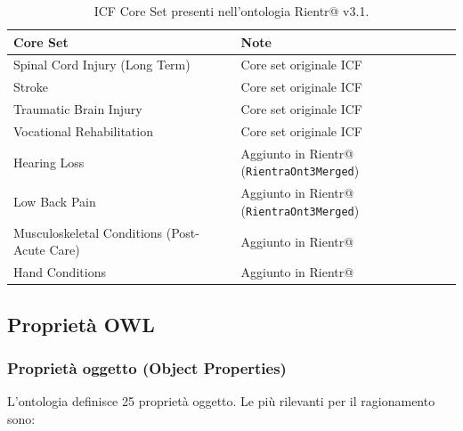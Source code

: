 \documentclass[a4paper,12pt]{article}
\begin{document}
\begin{table}[H]
\centering
\caption{ICF Core Set presenti nell'ontologia Rientr@ v3.1.}
\begin{tabular}{L{6cm} L{6.5cm}}
\toprule
\textbf{Core Set} & \textbf{Note} \\
\midrule
Spinal Cord Injury (Long Term) & Core set originale ICF \\
Stroke & Core set originale ICF \\
Traumatic Brain Injury & Core set originale ICF \\
Vocational Rehabilitation & Core set originale ICF \\
Hearing Loss & Aggiunto in Rientr@ (\texttt{RientraOnt3Merged}) \\
Low Back Pain & Aggiunto in Rientr@ (\texttt{RientraOnt3Merged}) \\
Musculoskeletal Conditions (Post-Acute Care) & Aggiunto in Rientr@ \\
Hand Conditions & Aggiunto in Rientr@ \\
\bottomrule
\end{tabular}
\end{table}

\subsection{Propriet\`{a} OWL}

\subsubsection{Propriet\`{a} oggetto (Object Properties)}

L'ontologia definisce 25 propriet\`{a} oggetto. Le pi\`{u} rilevanti
per il ragionamento sono:
\end{document}
